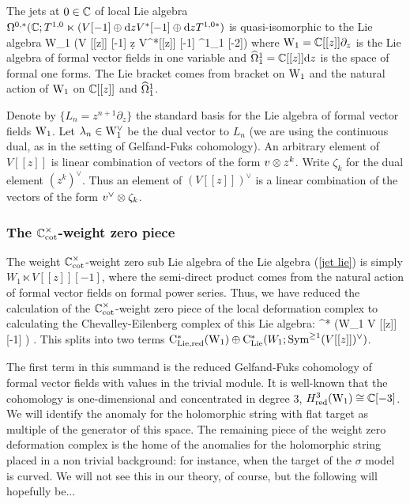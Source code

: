 \subsection{}

The jets at $0 \in \mathbb C$ of local Lie algebra $\Omega^{0,*}(\mathbb C ; T^{1,0} \ltimes (V[-1] \oplus {\rm d} z V^*[-1] \oplus {\rm d} z T^{1,0 *})$ is quasi-isomorphic to the Lie algebra
\be\label{jet lie}
{\rm W}_1 \ltimes (V [[z]] [-1] \oplus \d z V^*[[z]] [-1] \oplus \hOmega^1_1 [-2])
\ee
where ${\rm W}_1 = \mathbb C [[z]] \partial_z$ is the Lie algebra of formal vector fields in one variable and $\widehat{\Omega}^1_1 = \mathbb C [[z]] {\rm d} z$ is the space of formal one forms. 
The Lie bracket comes from bracket on ${\rm W}_1$ and the natural action of ${\rm W}_1$ on $\mathbb C [[z]]$ and $\widehat{\Omega}^1_1$. 

Denote by $\{L_n = z^{n+1} \partial_z\}$ the standard basis for the Lie algebra of formal vector fields ${\rm W}_1$. 
Let $\lambda_n \in {\rm W}_1^\vee$ be the dual vector to $L_n$ (we are using the continuous dual, as in the setting of Gelfand-Fuks cohomology). 
An arbitrary element of $V [[z]]$ is linear combination of vectors of the form $v \otimes z^k$. 
Write $\zeta_k$ for the dual element $(z^k)^\vee$. 
Thus an element of $(V [[z]])^\vee$ is a linear combination of the vectors of the form $v^\vee \otimes \zeta_k$. 

\subsubsection{The $\mathbb C^\times_{\rm cot}$-weight zero piece}

The weight $\mathbb C^\times_{\rm cot}$-weight zero sub Lie algebra of the Lie algebra (\ref{jet lie}) is simply $W_1 \ltimes V [[z]] [-1]$, where the semi-direct product comes from the natural action of formal vector fields on formal power series.
Thus, we have reduced the calculation of the $\mathbb C^\times_{\rm cot}$-weight zero piece of the local deformation complex to calculating the Chevalley-Eilenberg complex of this Lie algebra:
\ben
\cred^* \left({\rm W}_1 \ltimes V [[z]] [-1] \right) .
\een
This splits into two terms ${\rm C}_{\rm Lie,red}^* ({\rm W}_1) \oplus {\rm C}_{{\rm Lie}}^*(W_1 ;  {\rm Sym}^{\geq 1} (V [[z]])^\vee)$. 

The first term in this summand is the reduced Gelfand-Fuks cohomology of formal vector fields with values in the trivial module.
It is well-known that the cohomology is one-dimensional and concentrated in degree $3$, $H^3_{\rm red} ({\rm W}_1) \cong \mathbb C[-3]$. 
We will identify the anomaly for the holomorphic string with flat target as multiple of the generator of this space. 
The remaining piece of the weight zero deformation complex is the home of the anomalies for the holomorphic string placed in a non trivial background: for instance, when the target of the $\sigma$ model is curved. 
We will not see this in our theory, of course, but the following will hopefully be...

